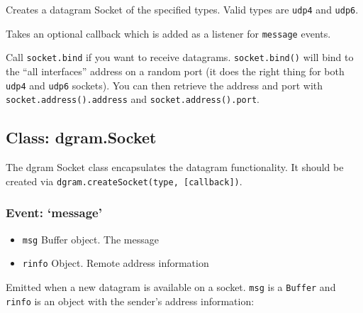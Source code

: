 Creates a datagram Socket of the specified types. Valid types are
\texttt{udp4} and \texttt{udp6}.

Takes an optional callback which is added as a listener for
\texttt{message} events.

Call \texttt{socket.bind} if you want to receive datagrams.
\texttt{socket.bind()} will bind to the ``all interfaces'' address on a
random port (it does the right thing for both \texttt{udp4} and
\texttt{udp6} sockets). You can then retrieve the address and port with
\texttt{socket.address().address} and \texttt{socket.address().port}.

\subsection{Class: dgram.Socket}\label{class-dgram.socket}

The dgram Socket class encapsulates the datagram functionality. It
should be created via \texttt{dgram.createSocket(type, {[}callback{]})}.

\subsubsection{Event: `message'}\label{event-message}

\begin{itemize}
\itemsep1pt\parskip0pt
\item
  \texttt{msg} Buffer object. The message
\item
  \texttt{rinfo} Object. Remote address information
\end{itemize}

Emitted when a new datagram is available on a socket. \texttt{msg} is a
\texttt{Buffer} and \texttt{rinfo} is an object with the sender's
address information:

\begin{Shaded}
\end{Shaded}

